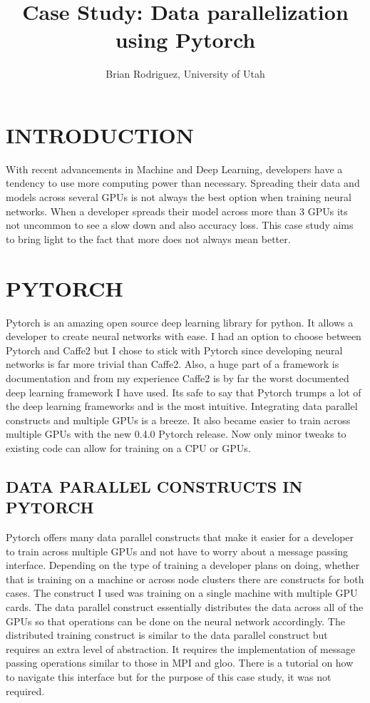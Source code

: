 \documentclass[12pt,conference]{ieeeconf}
\begin{document}
\title{Case Study: Data parallelization using Pytorch}
\author{Brian Rodriguez, University of Utah}
\maketitle

\section{INTRODUCTION}
	With recent advancements in Machine and Deep Learning, developers have a tendency to use more computing power than necessary. Spreading their data and models across several GPUs is not always the best option when training neural networks. When a developer spreads their model across more than 3 GPUs its not uncommon to see a slow down and also accuracy loss. This case study aims to bring light to the fact that more does not always mean better.
	
\section{PYTORCH}
	Pytorch is an amazing open source deep learning library for python. It allows a developer to create neural networks with ease. I had an option to choose between Pytorch and Caffe2 but I chose to stick with Pytorch since developing neural networks is far more trivial than Caffe2. Also, a huge part of a framework is documentation and from my experience Caffe2 is by far the worst documented deep learning framework I have used. Its safe to say that Pytorch trumps a lot of the deep learning frameworks and is the most intuitive. Integrating data parallel constructs and multiple GPUs is a breeze. It also became easier to train across multiple GPUs with the new 0.4.0 Pytorch release. Now only minor tweaks to existing code can allow for training on a CPU or GPUs.
		
\subsection{DATA PARALLEL CONSTRUCTS IN PYTORCH}
	Pytorch offers many data parallel constructs that make it easier for a developer to train across multiple GPUs and not have to worry about a message passing interface. Depending on the type of training a developer plans on doing, whether that is training on a machine or across node clusters there are constructs for both cases. The construct I used was training on a single machine with multiple GPU cards. The data parallel construct essentially distributes the data across all of the GPUs so that operations can be done on the neural network accordingly. The distributed training construct is similar to the data parallel construct but requires an extra level of abstraction. It requires the implementation of message passing operations similar to those in MPI and gloo. There is a tutorial on how to navigate this interface but for the purpose of this case study, it was not required.
	 
\end{document}
